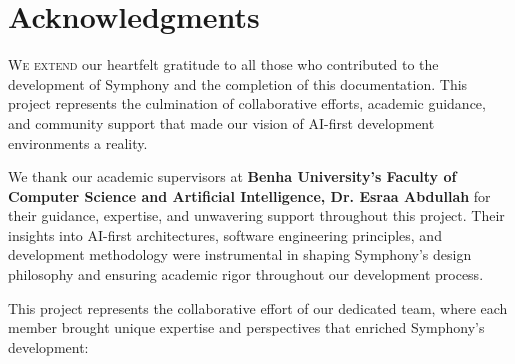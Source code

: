\section{Acknowledgments}
\label{sec:abstract}

\lettrine{W}{e extend} our heartfelt gratitude to all those who contributed to the development of Symphony and the completion of this  documentation. This project represents the culmination of collaborative efforts, academic guidance, and community support that made our vision of AI-first development environments a reality.

\vspace{0.2cm}

\begin{infobox}[title=Academic Excellence \& Project Guidance]
We thank our academic supervisors at \textbf{Benha University's Faculty of Computer Science and Artificial Intelligence, Dr. Esraa Abdullah} for their guidance, expertise, and unwavering support throughout this project. Their insights into AI-first architectures, software engineering principles, and development methodology were instrumental in shaping Symphony's design philosophy and ensuring academic rigor throughout our development process.
\end{infobox}


\vspace{0.2cm}

This project represents the collaborative effort of our dedicated team, where each member brought unique expertise and perspectives that enriched Symphony's development:

\vspace{0.2cm}

